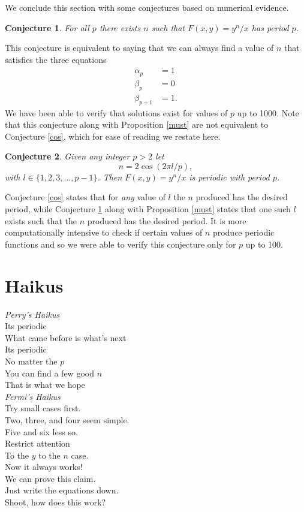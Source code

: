 \documentclass[12pt]{article}
\newtheorem{conjecture}{Conjecture}
\begin{document}
We conclude this section with some conjectures based on numerical evidence. 

\begin{conjecture}
\label{exists}
 For all $p$ there exists $n$ such that $F(x,y)=y^n/x$ has period $p$. 
\end{conjecture} 
This conjecture is equivalent to saying that we can always find a value of $n$ that satisfies the three equations 
\begin{align*}
\alpha_p &=1\\ 
\beta_p &=0\\
\beta_{p+1} &=1.
\end{align*}
We have been able to verify that solutions exist for values of $p$ up to 1000. Note that this conjecture along with Proposition \ref{must} are not equivalent to Conjecture \ref{cos}, which for ease of reading we restate here. 
\begin{conjecture}
Given any integer $p>2$ let 
\begin{equation*}
n = 2 \cos(2 \pi l/p),
\end{equation*}
with $l \in \{1,2,3, \ldots, p-1 \}$. Then $F(x,y) = y^n/x$ is periodic with period $p$.
\end{conjecture}
Conjecture \ref{cos} states that for \emph{any} value of $l$ the $n$ produced has the desired period, while Conjecture \ref{exists} along with Proposition \ref{must} states that one such $l$ exists such that the $n$ produced has the desired period. It is more computationally intensive to check if certain values of $n$ produce periodic functions and so we were able to verify this conjecture only for $p$ up to 100.

\section{Haikus} 
\emph{Perry's Haikus}\\

\noindent Its periodic  \\
What came before is what's next \\
Its periodic \\

\noindent No matter the $p$ \\
You can find a few good $n$\\
That is what we hope \\

\noindent\emph{Fermi's Haikus}\\

\noindent Try small cases first.\\
Two, three, and four seem simple.\\
Five and six less so.\\

\noindent Restrict attention\\
To the $y$ to the $n$ case.\\
Now it always works!\\ 

\noindent We can prove this claim.\\
Just write the equations down.\\
Shoot, how does this work?\\
\end{document}
